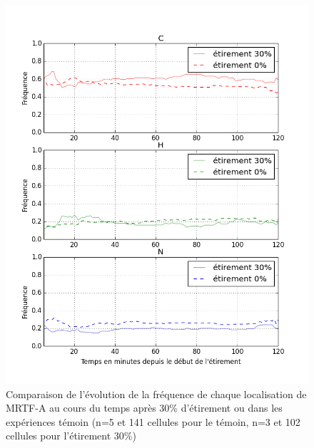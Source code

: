 \documentclass                                                                                                                                                                                                                                                                                                                                       {report}
\begin{document}
\begin{figure}[p]
\includegraphics[scale=0.5]{Figures/Etirement30_vs_0_dynamique.png} 
\caption{\label{Et30_CHN} Comparaison de l'évolution de la fréquence de chaque localisation de MRTF-A au cours du temps après 30\% d'étirement ou dans les expériences témoin (n=5 et 141 cellules pour le témoin, n=3 et 102 cellules pour l'étirement 30\%)}
\end{figure}
\end{document}
